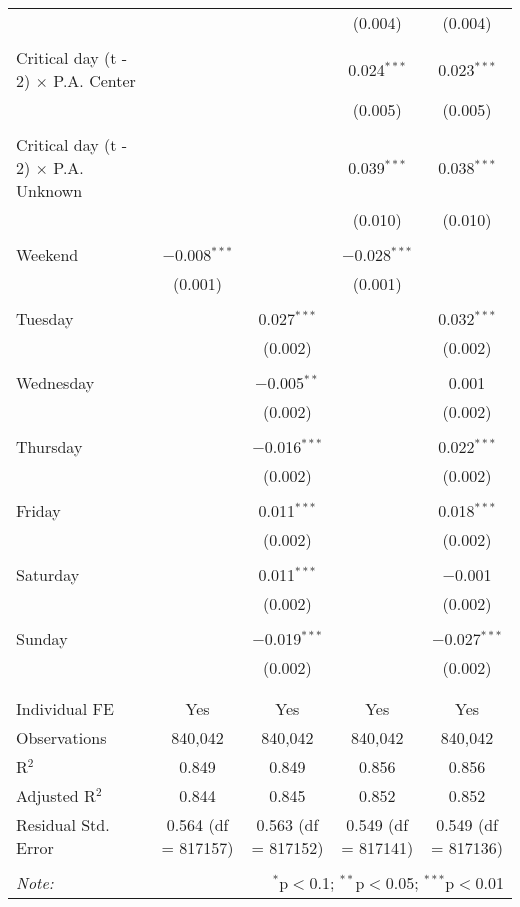 \documentclass[
]{article}
\begin{document}
\begin{table}[!htbp]
{\begin{tabular}{@{\extracolsep{5pt}}lcccc}
  &  &  & (0.004) & (0.004) \\ 
  & & & & \\ 
 Critical day (t - 2) $\times$ P.A. Center &  &  & 0.024$^{***}$ & 0.023$^{***}$ \\ 
  &  &  & (0.005) & (0.005) \\ 
  & & & & \\ 
 Critical day (t - 2) $\times$ P.A. Unknown &  &  & 0.039$^{***}$ & 0.038$^{***}$ \\ 
  &  &  & (0.010) & (0.010) \\ 
  & & & & \\ 
 Weekend & $-$0.008$^{***}$ &  & $-$0.028$^{***}$ &  \\ 
  & (0.001) &  & (0.001) &  \\ 
  & & & & \\ 
 Tuesday &  & 0.027$^{***}$ &  & 0.032$^{***}$ \\ 
  &  & (0.002) &  & (0.002) \\ 
  & & & & \\ 
 Wednesday &  & $-$0.005$^{**}$ &  & 0.001 \\ 
  &  & (0.002) &  & (0.002) \\ 
  & & & & \\ 
 Thursday &  & $-$0.016$^{***}$ &  & 0.022$^{***}$ \\ 
  &  & (0.002) &  & (0.002) \\ 
  & & & & \\ 
 Friday &  & 0.011$^{***}$ &  & 0.018$^{***}$ \\ 
  &  & (0.002) &  & (0.002) \\ 
  & & & & \\ 
 Saturday &  & 0.011$^{***}$ &  & $-$0.001 \\ 
  &  & (0.002) &  & (0.002) \\ 
  & & & & \\ 
 Sunday &  & $-$0.019$^{***}$ &  & $-$0.027$^{***}$ \\ 
  &  & (0.002) &  & (0.002) \\ 
  & & & & \\ 
\hline \\[-1.8ex] 
Individual FE & Yes & Yes & Yes & Yes \\ 
Observations & 840,042 & 840,042 & 840,042 & 840,042 \\ 
R$^{2}$ & 0.849 & 0.849 & 0.856 & 0.856 \\ 
Adjusted R$^{2}$ & 0.844 & 0.845 & 0.852 & 0.852 \\ 
Residual Std. Error & 0.564 (df = 817157) & 0.563 (df = 817152) & 0.549 (df = 817141) & 0.549 (df = 817136) \\ 
\hline 
\hline \\[-1.8ex] 
\textit{Note:}  & \multicolumn{4}{r}{$^{*}$p$<$0.1; $^{**}$p$<$0.05; $^{***}$p$<$0.01} \\ 
\end{tabular}
} 
\end{table} 
\newpage
\end{document}
